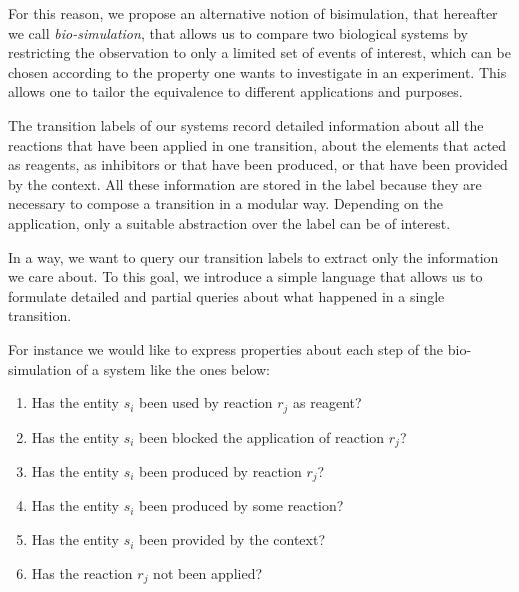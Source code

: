 For this reason, we propose an alternative notion of bisimulation, that hereafter we call \emph{bio-simulation},
that allows us  to compare two biological systems by restricting the observation to only a limited set of events of interest, which can be chosen according to the property one wants to investigate in an experiment.
This allows one to tailor the equivalence to different applications and purposes. 

The transition labels of our systems record detailed information about all the reactions that have been applied in one transition, about the elements that acted as reagents, as inhibitors or that have been produced, or that have been provided by the context.
All these information are stored in the label because they are necessary to compose a transition in a modular way. Depending on the application, only a suitable abstraction over the label can be of interest.

In a way, we want to query our transition labels to extract only the information we care about.
To this goal, we introduce a simple language
that allows us to formulate detailed and partial queries about what happened in a single transition.

\begin{example} \label{properties_ex}
For instance we would like to express properties about each step of the bio-simulation of a system like the ones below:
\begin{enumerate}
\item Has the entity $s_i$ been used by reaction $r_j$ as reagent?
\item Has the entity $s_i$ been blocked the application of  reaction $r_j$?
\item Has the entity $s_i$ been produced by reaction $r_j$?
\item Has the entity $s_i$ been produced by some reaction?
\item Has the entity $s_i$ been provided by the context? 
\item Has the reaction $r_j$ not been applied? 
\end{enumerate}
\end{example}

